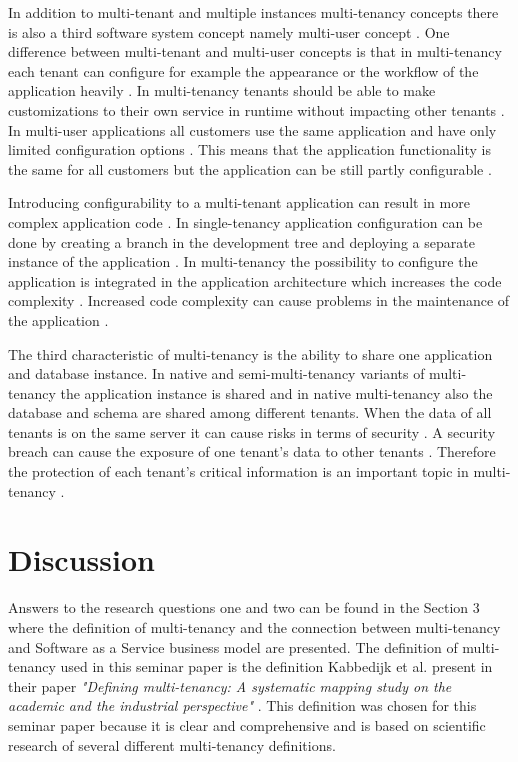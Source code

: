 \documentclass[conference]{sasmoota2017}
\begin{document}
In addition to multi-tenant and multiple instances multi-tenancy concepts there is also a third software system concept namely multi-user concept \cite{Bezemer:2010:MaintenanceDream}. One difference between multi-tenant and multi-user concepts is that in multi-tenancy each tenant can configure for example the appearance or the workflow of the application heavily \cite{Bezemer:2010:MaintenanceDream}. In multi-tenancy tenants should be able to make customizations to their own service in runtime without impacting other tenants \cite{Guo:2007:FrameworkForNative}. In multi-user applications all customers use the same application and have only limited configuration options \cite{Bezemer:2010:MaintenanceDream}. This means that the application functionality is the same for all customers but the application can be still partly configurable \cite{Kabbedijk2015:Defining}. 

Introducing configurability to a multi-tenant application can result in more complex application code \cite{Bezemer:2010:EnablingMultiTenancy}. In single-tenancy application configuration can be done by creating a branch in the development tree and deploying a separate instance of the application \cite{Bezemer:2010:MaintenanceDream}. In multi-tenancy the possibility to configure the application is integrated in the application architecture which increases the code complexity \cite{Bezemer:2010:MaintenanceDream}. Increased code complexity can cause problems in the maintenance of the application \cite{Bezemer:2010:MaintenanceDream}. 

The third characteristic of multi-tenancy is the ability to share one application and database instance. In native and semi-multi-tenancy variants of multi-tenancy the application instance is shared and in native multi-tenancy also the database and schema are shared among different tenants. When the data of all tenants is on the same server it can cause risks in terms of security \cite{Bezemer:2010:EnablingMultiTenancy}. A security breach can cause the exposure of one tenant's data to other tenants \cite{Bezemer:2010:MaintenanceDream}. Therefore the protection of each tenant's critical information is an important topic in multi-tenancy \cite{Guo:2007:FrameworkForNative}.



\section{Discussion}

Answers to the research questions one and two can be found in the Section 3 where the definition of multi-tenancy and the connection between multi-tenancy and Software as a Service business model are presented. The definition of multi-tenancy used in this seminar paper is the definition Kabbedijk et al. present in their paper \textit{"Defining multi-tenancy: A systematic mapping study on the academic and the industrial perspective"} \cite{Kabbedijk2015:Defining}. This definition was chosen for this seminar paper because it is clear and comprehensive and is based on scientific research of several different multi-tenancy definitions.
\end{document}
